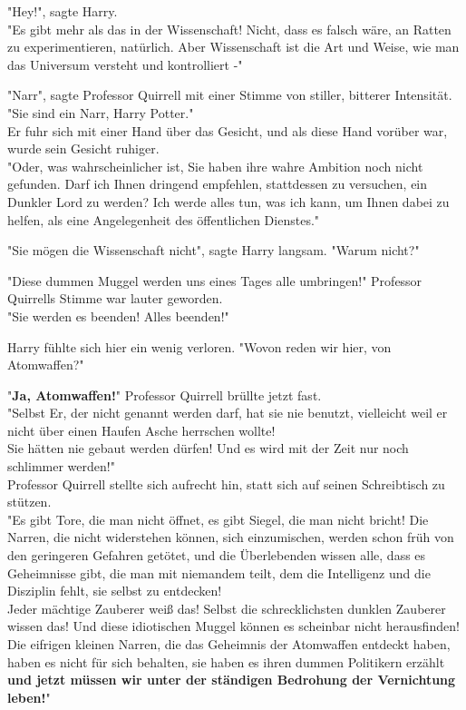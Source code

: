{"Hey!", sagte Harry.\\ "Es gibt mehr als das in der Wissenschaft! Nicht, dass es falsch wäre, an Ratten zu experimentieren, natürlich. Aber Wissenschaft ist die Art und Weise, wie man das Universum versteht und kontrolliert -"

"Narr", sagte Professor Quirrell mit einer Stimme von stiller, bitterer Intensität.\\ "Sie sind ein Narr, Harry Potter."\\ Er fuhr sich mit einer Hand über das Gesicht, und als diese Hand vorüber war, wurde sein Gesicht ruhiger.\\ "Oder, was wahrscheinlicher ist, Sie haben ihre wahre Ambition noch nicht gefunden. Darf ich Ihnen dringend empfehlen, stattdessen zu versuchen, ein Dunkler Lord zu werden? Ich werde alles tun, was ich kann, um Ihnen dabei zu helfen, als eine Angelegenheit des öffentlichen Dienstes."

"Sie mögen die Wissenschaft nicht", sagte Harry langsam. "Warum nicht?"

"Diese dummen Muggel werden uns eines Tages alle umbringen!" Professor Quirrells Stimme war lauter geworden.\\ "Sie werden es beenden! Alles beenden!"

Harry fühlte sich hier ein wenig verloren. "Wovon reden wir hier, von Atomwaffen?"

"\textbf{Ja, Atomwaffen!}" Professor Quirrell brüllte jetzt fast.\\ "Selbst Er, der nicht genannt werden darf, hat sie nie benutzt, vielleicht weil er nicht über einen Haufen Asche herrschen wollte!\\ Sie hätten nie gebaut werden dürfen! Und es wird mit der Zeit nur noch schlimmer werden!"\\ Professor Quirrell stellte sich aufrecht hin, statt sich auf seinen Schreibtisch zu stützen.\\ "Es gibt Tore, die man nicht öffnet, es gibt Siegel, die man nicht bricht! Die Narren, die nicht widerstehen können, sich einzumischen, werden schon früh von den geringeren Gefahren getötet, und die Überlebenden wissen alle, dass es Geheimnisse gibt, die man mit niemandem teilt, dem die Intelligenz und die Disziplin fehlt, sie selbst zu entdecken!\\ Jeder mächtige Zauberer weiß das! Selbst die schrecklichsten dunklen Zauberer wissen das! Und diese idiotischen Muggel können es scheinbar nicht herausfinden!\\ Die eifrigen kleinen Narren, die das Geheimnis der Atomwaffen entdeckt haben, haben es nicht für sich behalten, sie haben es ihren dummen Politikern erzählt \textbf{und jetzt müssen wir unter der ständigen Bedrohung der Vernichtung leben!}"

}
